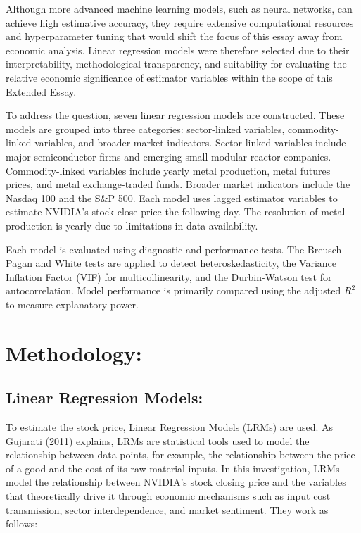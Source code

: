\documentclass[12pt]{article}
\begin{document}
    \vspace{1em}
    
    Although more advanced machine learning models, such as neural networks, can achieve high estimative accuracy, they require extensive computational resources and hyperparameter tuning that would shift the focus of this essay away from economic analysis. Linear regression models were therefore selected due to their interpretability, methodological transparency, and suitability for evaluating the relative economic significance of estimator variables within the scope of this Extended Essay.
    
    \vspace{1em}
    
    To address the question, seven linear regression models are constructed. These models are grouped into three categories: sector-linked variables, commodity-linked variables, and broader market indicators. Sector-linked variables include major semiconductor firms and emerging small modular reactor companies. Commodity-linked variables include yearly metal production, metal futures prices, and metal exchange-traded funds. Broader market indicators include the Nasdaq 100 and the S\&P 500. Each model uses lagged estimator variables to estimate NVIDIA's stock close price the following day. The resolution of metal production is yearly due to limitations in data availability.
    
    \vspace{1em}
    
    Each model is evaluated using diagnostic and performance tests. The Breusch--Pagan and White tests are applied to detect heteroskedasticity, the Variance Inflation Factor (VIF) for multicollinearity, and the Durbin-Watson test for autocorrelation. Model performance is primarily compared using the adjusted $R^2$ to measure explanatory power.
    
    \section{Methodology:}

    \subsection{Linear Regression Models:}
    
    To estimate the stock price, Linear Regression Models (LRMs) are used. As Gujarati (2011) explains, LRMs are statistical tools used to model the relationship between data points, for example, the relationship between the price of a good and the cost of its raw material inputs. In this investigation, LRMs model the relationship between NVIDIA's stock closing price and the variables that theoretically drive it through economic mechanisms such as input cost transmission, sector interdependence, and market sentiment. They work as follows:
    
\end{document}
